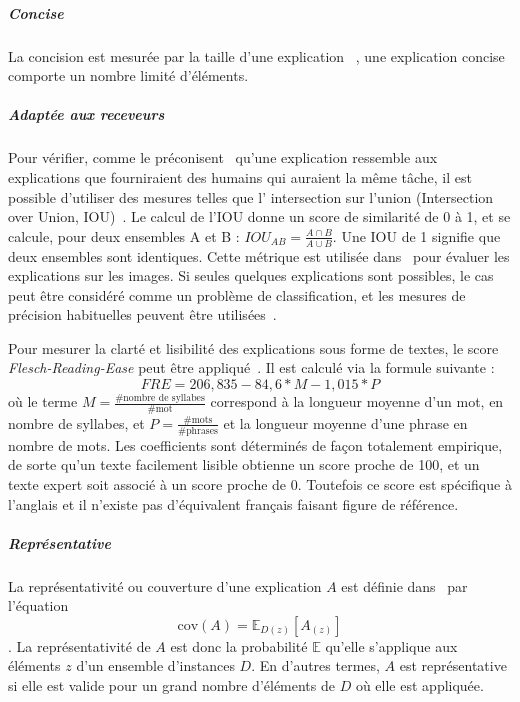 \subparagraph{Concise}
La concision est mesurée par la taille d'une explication ~\cite{Ribeiro2016, Poppi2021,Lakkaraju2019,Zafar2021a}, une explication concise comporte un nombre limité d'éléments.


\subparagraph{Adaptée aux receveurs}
Pour vérifier, comme le préconisent~\cite{Dam2018, DeYoung2019} qu'une explication ressemble aux explications que fourniraient des humains qui auraient la même tâche, il est possible d'utiliser des mesures telles que l' intersection sur l'union (Intersection over Union, IOU)~\cite{DeYoung2019}. Le calcul de l'IOU donne un score de similarité de 0 à 1, et se calcule, pour deux ensembles A et B : $IOU_{AB} = \frac{A\cap B}{A\cup B}$. Une IOU de 1 signifie que deux ensembles sont identiques. Cette métrique est utilisée dans~\cite{Bau2017} pour évaluer les explications sur les images. Si seules quelques explications sont possibles, le cas peut être considéré comme un problème de classification, et les mesures de précision habituelles peuvent être utilisées~\cite{Codella2019}.

Pour mesurer la clarté et lisibilité des explications sous forme de textes, le score \textit{Flesch-Reading-Ease} peut être appliqué~\cite{Costa2018}. Il est calculé via la formule suivante :
\begin{equation}
    FRE = 206,835 - 84,6 * M - 1,015 * P
\end{equation}
où le terme $M = \frac{\#\textrm{nombre de syllabes}}{\#\textrm{mot}}$ correspond à la longueur moyenne d'un mot, en nombre de syllabes, et $P = \frac{\#\textrm{mots}}{\#\textrm{phrases}}$ et la longueur moyenne d'une phrase en nombre de mots. Les coefficients sont déterminés de façon totalement empirique, de sorte qu'un texte facilement lisible obtienne un score proche de 100, et un texte expert soit associé à un score proche de 0.
Toutefois ce score est spécifique à l'anglais et il n'existe pas d'équivalent français faisant figure de référence.

\subparagraph{Représentative}
La représentativité ou couverture d'une explication $A$ est définie dans~\cite{Ribeiro2018} par l'équation
\begin{equation}
    \textrm{cov}(A) = \mathbb{E}_{D(z)}[A_{(z)}]
\end{equation}.
La représentativité de $A$ est donc la probabilité $\mathbb{E}$ qu'elle s'applique aux éléments $z$ d'un ensemble d'instances $D$. En d'autres termes, $A$ est représentative si elle est valide pour un grand nombre d'éléments de $D$ où elle est appliquée.


